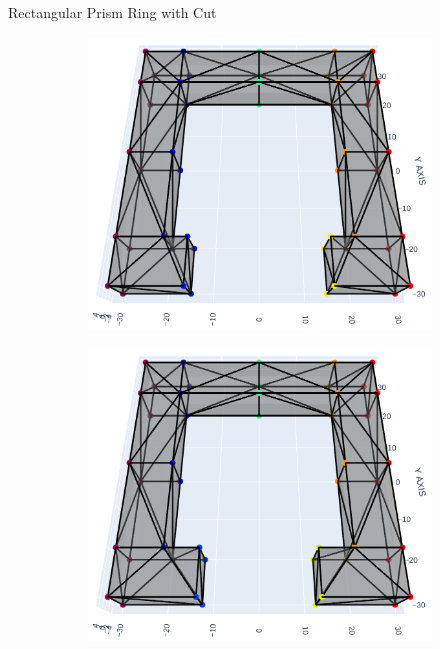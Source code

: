 \documentclass[xcolor=dvipsnames, aspectratio=169]{beamer}
\begin{document}
\begin{frame}{Rectangular Prism Ring with Cut}
\begin{figure}
\begin{subfigure}[b]{0.15\textwidth}
\end{subfigure}
\begin{subfigure}[b]{0.15\textwidth}
\includegraphics[width=\linewidth]{Final Run, (rect prism ring 30 mm cut) meshpy plotly screenshot.png}
\end{subfigure}
\begin{subfigure}[b]{0.15\textwidth}
\includegraphics[width=\linewidth]{Final Run, (rect prism ring 25 mm cut) meshpy plotly screenshot.png}
\end{subfigure}

\end{figure}
\end{frame}
\end{document}
